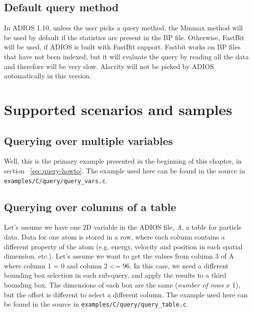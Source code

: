 \subsection{Default query method}
In ADIOS 1.10, unless the user picks a query method, the Minmax method will be used by default if the statistics are present in the BP file. Otherwise, FastBit will be used, if ADIOS is built with FastBit support. Fastbit works on BP files that have not been indexed, but it will evaluate the query by reading all the data and therefore will be very slow. Alacrity will not be picked by ADIOS automatically in this version.



%
%
\section{Supported scenarios and samples}


\subsection{Querying over multiple variables}
Well, this is the primary example presented in the beginning of this chapter, in section ~\ref{sec:query-howto}. The example used here can be found in the source in \verb+examples/C/query/query_vars.c+.

\subsection{Querying over columns of a table}
\label{sec:query-example-columns}
Let's assume we have one 2D variable in the ADIOS file, \emph{A}, a table for particle data. Data for one atom is stored in a row, where each column contains a different property of the atom (e.g. energy, velocity and position in each spatial dimension, etc.).
Let's assume we want to get the values from column 3 of A where column 1 = 0 and  column 2 <= 96.
In this case, we need a different bounding box selection in each sub-query, and apply the results to a third bounding box. The dimensions of each box are the same (\emph{number of rows} $x$ 1), but the offset is different to select a different column. The example used here can be found in the source in \verb+examples/C/query/query_table.c+.

